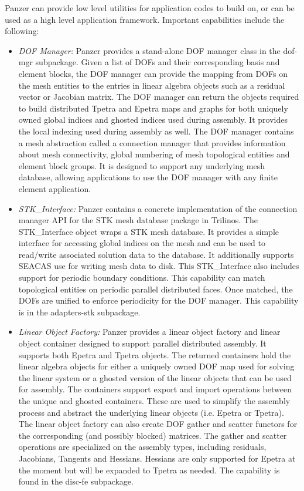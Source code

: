 Panzer can provide low level utilities for application codes to build on, or can be used as a high level application framework. Important capabilities include the following:
\begin{itemize}
\item \emph{DOF Manager:} Panzer provides a stand-alone DOF manager class in the dof-mgr subpackage. Given a list of DOFs and their corresponding basis and element blocks, the DOF manager can provide the mapping from DOFs on the mesh entities to the entries in linear algebra objects such as a residual vector or Jacobian matrix. The DOF manager can return the objects required to build distributed Tpetra and Epetra maps and graphs for both uniquely owned global indices and ghosted indices used during assembly. It provides the local indexing used during assembly as well. The DOF manager contains a mesh abstraction called a connection manager that provides information about mesh connectivity, global numbering of mesh topological entities and element block groups. It is designed to support any underlying mesh database, allowing applications to use the DOF manager with any finite element application.
\item \emph{STK\_Interface:} Panzer contains a concrete implementation of the connection manager API for the STK mesh database package in Trilinos. The STK\_Interface object wraps a STK mesh database. It provides a simple interface for accessing global indices on the mesh and can be used to read/write associated solution data to the database. It additionally supports SEACAS use for writing mesh data to disk. This STK\_Interface also includes support for periodic boundary conditions.  This capability can match topological entities on periodic parallel distributed faces. Once matched, the DOFs are unified to enforce periodicity for the DOF manager. This capability is in the adapters-stk subpackage.
\item \emph{Linear Object Factory:} Panzer provides a linear object factory and linear object container designed to support parallel distributed assembly. It supports both Epetra and Tpetra objects. The returned containers hold the linear algebra objects for either a uniquely owned DOF map used for solving the linear system or a ghosted version of the linear objects that can be used for assembly. The containers support export and import operations between the unique and ghosted containers. These are used to simplify the assembly process and abstract the underlying linear objects (i.e. Epetra or Tpetra). The linear object factory can also create DOF gather and scatter functors for the corresponding (and possibly blocked) matrices. The gather and scatter operations are specialized on the assembly types, including residuals, Jacobians, Tangents and Hessians. Hessians are only supported for Epetra at the moment but will be expanded to Tpetra as needed. The capability is found in the disc-fe subpackage.

\end{itemize}

